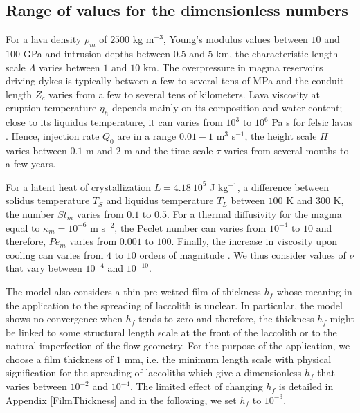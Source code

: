 \subsection{Range of values for the dimensionless numbers}
\label{sec:range-valu-dimens}
 
For a  lava density  $\rho_m$ of $2500$  kg m$^{-3}$,  Young's modulus
values between $10$  and $100$ GPa and intrusion  depths between $0.5$
and $5$ km,  the characteristic length scale  $\Lambda$ varies between
$1$ and $10$  km.  The overpressure in magma  reservoirs driving dykes
is   typically    between   a   few    to   several   tens    of   MPa
\citep{Tait:1988vn,Marti:2000fe} and  the conduit length  $Z_c$ varies
from a few  to several tens of kilometers. Lava  viscosity at eruption
temperature  $\eta_h$  depends mainly  on  its  composition and  water
content; close to its liquidus  temperature, it can varies from $10^3$
to       $10^{6}$       Pa        s       for       felsic       lavas
\citep{Anonymous:CZVBrBvv,Giordano:2008em,Whittington:2009fv,Chevrel:2013jn}.
Hence, injection  rate $Q_0$ are  in a range $0.01-1$  m$^3$ s$^{-1}$,
the height  scale $H$ varies  between $0.1$ m and  $2$ m and  the time
scale $\tau$ varies from several months to a few years.

For a  latent heat of crystallization  $L = 4.18~10^5$ J  kg$^{-1}$, a
difference between solidus temperature  $T_S$ and liquidus temperature
$T_L$ between $100$ K and $300$ K, the number $St_m$ varies from $0.1$
to  $0.5$.   For  a  thermal   diffusivity  for  the  magma  equal  to
$\kappa_m=  10^{-6}$ m  s$^{-2}$, the  Peclet number  can varies  from
$10^{-4}$ to $10$ and therefore,  $Pe_m$ varies from $0.001$ to $100$.
Finally, the increase in viscosity upon cooling can varies from $4$ to
$10$                orders                 of                magnitude
\citep{Anonymous:CZVBrBvv,Lejeune:1995fc,Giordano:2008em,Diniega:2013eh}.
We  thus consider  values of  $\nu$  that vary  between $10^{-4}$  and
$10^{-10}$.

The model  also considers  a thin pre-wetted  film of  thickness $h_f$
whose  meaning in  the application  to the  spreading of  laccolith is
unclear.  In  particular, the  model shows  no convergence  when $h_f$
tends to zero \citep{Lister:2013ia} and therefore, the thickness $h_f$
might be  linked to some structural  length scale at the  front of the
laccolith or to the natural imperfection of the flow geometry.  For the
purpose  of  the  application,  we  choose a  film  thickness  of  $1$
mm, i.e. the minimum length scale with physical signification for the
spreading of laccoliths  which give a dimensionless  $h_f$ that varies
between $10^{-2}$ and $10^{-4}$.  The limited effect of changing $h_f$
is detailed in  Appendix \ref{FilmThickness} and in  the following, we
set $h_f$ to $10^{-3}$.

